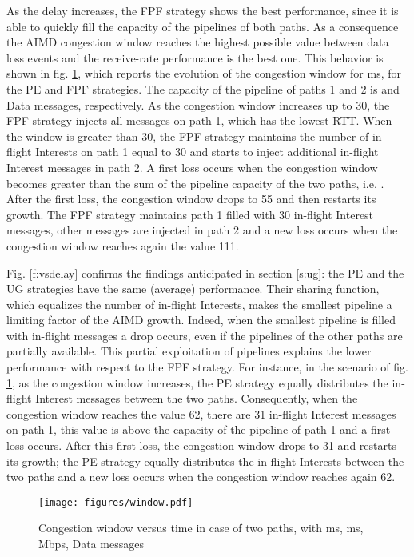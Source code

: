 \documentclass{sig-alternate-10pt}
\begin{document}
As the delay  increases, the FPF strategy shows the best performance, since it is able to quickly fill the capacity of the pipelines of both paths. As a consequence the AIMD congestion window reaches the highest possible value between data loss events and the receive-rate performance is the best one. This behavior is shown in fig. \ref{f:window}, which reports the evolution of the congestion window for  ms, for the PE and FPF strategies. The capacity of the pipeline of paths 1 and 2 is  and  Data messages, respectively.  As the congestion window increases up to 30, the FPF strategy injects all messages on path 1, which has the lowest RTT. When the window is greater than 30, the FPF strategy maintains the number of in-flight Interests on path 1 equal to 30 and starts to inject additional in-flight Interest messages in path 2. A first loss occurs when the congestion window becomes greater than the sum of the pipeline capacity of the two paths, i.e. . After the first loss, the congestion window drops to 55 and then restarts its growth. The FPF strategy maintains path 1 filled with 30 in-flight Interest messages, other messages are injected in path 2 and a new loss occurs when the congestion window reaches again the value 111.


Fig. \ref{f:vsdelay} confirms the findings anticipated in section \ref{s:ug}: the PE and the UG strategies have the same (average) performance. Their sharing function, which equalizes the number of in-flight Interests, makes the smallest pipeline a limiting factor of the AIMD growth. Indeed, when the smallest pipeline is filled with in-flight messages a drop occurs, even if the pipelines of the other paths are partially available. This partial exploitation of pipelines explains the lower performance with respect to the FPF strategy. For instance, in the scenario of fig. \ref{f:window}, as the congestion window increases, the PE strategy equally distributes the in-flight Interest messages between the two paths. Consequently, when the congestion window reaches the value 62,  there are 31 in-flight Interest messages on path 1, this value is above the capacity of the pipeline of path 1 and a first loss occurs. After this first loss, the congestion window drops to 31 and restarts its growth; the PE strategy equally distributes the in-flight Interests between the two paths and a new loss occurs when the congestion window reaches again 62.



\begin{figure}[t]
\centering
\texttt{[image: figures/window.pdf]}
\caption{Congestion window versus time in case of two paths, with  ms,  ms,  Mbps,  Data messages}
\label{f:window}
\vspace{-10pt}
\end{figure}
\end{document}
